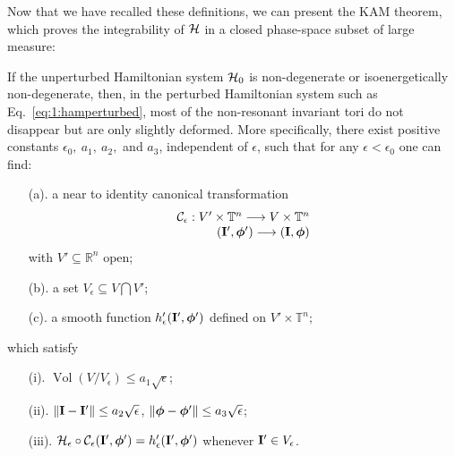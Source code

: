 Now that we have recalled these definitions, we can present the KAM theorem, which proves the integrability of $\mathcal{H}$ in a closed phase-space subset of large measure:
\begin{theorem}\label{th:kam}
If the unperturbed Hamiltonian system $\mathcal{H}_0$ is non-degenerate or isoenergetically non-degenerate, then, in the perturbed Hamiltonian system such as Eq.~\eqref{eq:1:hamperturbed}, most of the non-resonant invariant tori do not disappear but are only slightly deformed. More specifically, there exist positive constants $\epsilon_0,\ a_1,\ a_2,$ and $a_3$, independent of $\epsilon$, such that for any $\epsilon < \epsilon_0$ one can find:
\begin{enumerate}
    \item [(a).] a near to identity canonical transformation
    \begin{equation}
        \begin{array}{r}
        \mathcal{C}_\epsilon: V'\times\mathbb{T}^{n} \longrightarrow V\times\mathbb{T}^n \\
        (\vb{I}', \boldsymbol{\phi}') \longrightarrow(\vb{I}, \boldsymbol{\phi})
        \end{array}
    \end{equation}
    with $V' \subseteq \mathbb{R}^n$ open;
    \item [(b).] a set $V_\epsilon \subseteq V \bigcap V'$;
    \item [(c).] a smooth function $h'_\epsilon(\vb{I}', \boldsymbol{\phi}')$ defined on $V'\times \mathbb{T}^n$;
\end{enumerate}
which satisfy
\begin{enumerate}
    \item [(i).] $\operatorname{Vol}(V/V_\epsilon) \leq a_1\sqrt{\epsilon}$;
    \item [(ii).] $\norm{\vb{I}-\vb{I}'}\leq a_2 \sqrt{\epsilon}$, $\norm{\boldsymbol{\phi} - \boldsymbol{\phi}'} \leq a_3 \sqrt{\epsilon}$;
    \item [(iii).] $\mathcal{H}_\epsilon \circ \mathcal{C}_\epsilon (\vb{I}', \boldsymbol{\phi}') = h'_\epsilon (\vb{I}', \boldsymbol{\phi}')$ whenever $\vb{I}'\in V_\epsilon$.
\end{enumerate}

\end{theorem}

